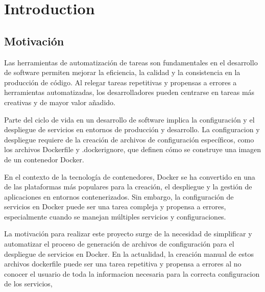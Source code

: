 \documentclass[12pt, a4paper, twoside]{article}
\begin{document}

\newpage




\newpage


\newpage

\tableofcontents
\newpage








\section{Introduction}

\subsection{Motivación}
Las herramientas de automatización de tareas son fundamentales en el desarrollo de software permiten mejorar la eficiencia, la calidad y la consistencia en la producción de código.
Al relegar tareas repetitivas y propensas a errores a herramientas automatizadas, los desarrolladores pueden centrarse en tareas más creativas y de mayor valor añadido.

Parte del ciclo de vida en un desarrollo de software implica la configuración y el despliegue de servicios en entornos de producción y desarrollo.
La configuracion y despliegue requiere de la creación de archivos de configuración específicos, como los archivos Dockerfile y .dockerignore, que definen cómo se construye una imagen de un contenedor Docker.

En el contexto de la tecnología de contenedores, Docker se ha convertido en una de las plataformas más populares para la creación, el despliegue y la gestión de aplicaciones en entornos contenerizados. 
Sin embargo, la configuración de servicios en Docker puede ser una tarea compleja y propensa a errores, especialmente cuando se manejan múltiples servicios y configuraciones.

La motivación para realizar este proyecto surge de la necesidad de simplificar y automatizar el proceso de generación de archivos de configuración para el despliegue de servicios en Docker. 
En la actualidad, la creación manual de estos archivos dockerfile puede ser una tarea repetitiva y propensa a errores al no conocer el usuario de toda la informacion necesaria para la correcta configuracion de los servicios, 
\end{document}
